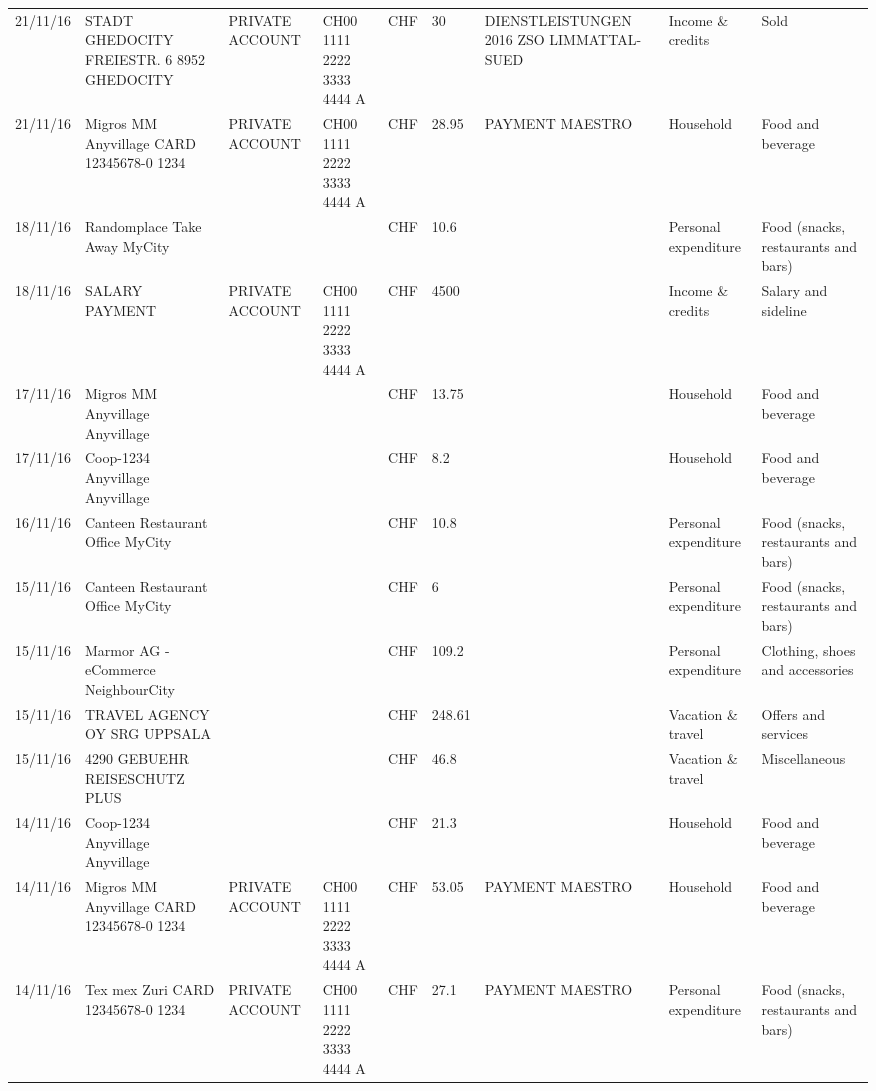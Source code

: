 \begin{landscape}
\begin{center}
\begin{longtable}{lllllllll}
		21/11/16 & STADT GHEDOCITY FREIESTR. 6 8952 GHEDOCITY & PRIVATE ACCOUNT & CH00 1111 2222 3333 4444 A & CHF   & 30    & DIENSTLEISTUNGEN 2016      ZSO LIMMATTAL-SUED & Income \& credits & Sold \\
		21/11/16 & Migros MM Anyvillage CARD 12345678-0 1234 & PRIVATE ACCOUNT & CH00 1111 2222 3333 4444 A & CHF   & 28.95 & PAYMENT MAESTRO & Household & Food and beverage \\
		18/11/16 & Randomplace Take Away     MyCity &       &       & CHF   & 10.6  &       & Personal expenditure & Food (snacks, restaurants and bars) \\
		18/11/16 & SALARY PAYMENT & PRIVATE ACCOUNT & CH00 1111 2222 3333 4444 A & CHF   & 4500  &       & Income \& credits & Salary and sideline \\
		17/11/16 & Migros MM Anyvillage    Anyvillage &       &       & CHF   & 13.75 &       & Household & Food and beverage \\
		17/11/16 & Coop-1234 Anyvillage    Anyvillage &       &       & CHF   & 8.2   &       & Household & Food and beverage \\
		16/11/16 & Canteen Restaurant Office      MyCity &       &       & CHF   & 10.8  &       & Personal expenditure & Food (snacks, restaurants and bars) \\
		15/11/16 & Canteen Restaurant Office      MyCity &       &       & CHF   & 6     &       & Personal expenditure & Food (snacks, restaurants and bars) \\
		15/11/16 & Marmor AG - eCommerce     NeighbourCity &       &       & CHF   & 109.2 &       & Personal expenditure & Clothing, shoes and accessories \\
		15/11/16 & TRAVEL AGENCY OY SRG     UPPSALA &       &       & CHF   & 248.61 &       & Vacation \& travel & Offers and services \\
		15/11/16 & 4290 GEBUEHR REISESCHUTZ PLUS &       &       & CHF   & 46.8  &       & Vacation \& travel & Miscellaneous \\
		14/11/16 & Coop-1234 Anyvillage    Anyvillage &       &       & CHF   & 21.3  &       & Household & Food and beverage \\
		14/11/16 & Migros MM Anyvillage CARD 12345678-0 1234 & PRIVATE ACCOUNT & CH00 1111 2222 3333 4444 A & CHF   & 53.05 & PAYMENT MAESTRO & Household & Food and beverage \\
		14/11/16 & Tex mex Zuri CARD 12345678-0 1234 & PRIVATE ACCOUNT & CH00 1111 2222 3333 4444 A & CHF   & 27.1  & PAYMENT MAESTRO & Personal expenditure & Food (snacks, restaurants and bars) \\

\end{longtable}
\end{center}
\end{landscape}
